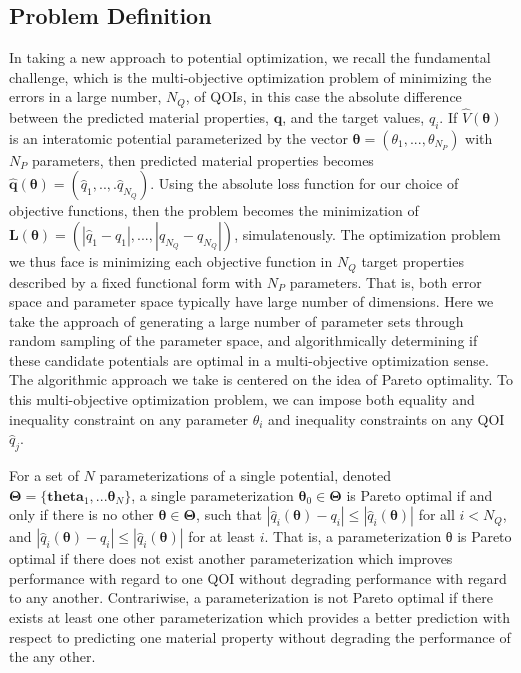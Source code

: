 \subsection{Problem Definition}

In taking a new approach to potential optimization, we recall the fundamental challenge, which is the multi-objective optimization problem of minimizing the errors in a large number, $N_Q$, of QOIs, in this case the absolute difference between the predicted material properties, $\bm{q}$, and the target values, $q_i$.  If  $\hat{V}(\bm{\theta})$ is an interatomic potential parameterized by the vector $\bm{\theta} = (\theta_1,...,\theta_{N_P})$ with $N_P$ parameters, then predicted material properties becomes $\hat{\bm{q}}(\bm{\theta}) = (\hat{q}_1,..,.\hat{q}_{N_Q})$.
Using the absolute loss function for our choice of objective functions, then the problem becomes the minimization of  $\bm{L}(\bm{\theta}) = (|\hat{q}_1-q_1|,...,|\hat{q}_{N_Q}-q_{N_Q}|)$, simulatenously.
The optimization problem we thus face is minimizing each objective function in $N_Q$ target properties described by a fixed functional form with $N_P$ parameters.  That is, both error space and parameter space typically have large number of dimensions.  Here we take the approach of generating a large number of parameter sets through random sampling of the parameter space, and algorithmically determining if these candidate potentials are optimal in a multi-objective optimization sense.  The algorithmic approach we take is centered on the idea of Pareto optimality.  To this multi-objective optimization problem, we can impose both equality and inequality constraint on any parameter $\theta_i$ and inequality constraints on any QOI $\hat{q}_j$.

For a set of $N$ parameterizations of a single potential, denoted $\bm{\Theta}= \{\bm{theta}_1,...\bm{\theta}_N\}$, a single parameterization $\bm{\theta}_0 \in \bm{\Theta}$ is Pareto optimal if and only if there is no other $\bm{\theta} \in \bm{\Theta}$, such that $|\hat{q}_i(\bm{\theta})-q_i| \leq |\hat{q}_i(\bm{\theta})|$
for all $i<N_Q$, and $|\hat{q}_i(\bm{\theta})-q_i| \leq |\hat{q}_i(\bm{\theta})|$ for at least $i$.  That is, a parameterization θ is Pareto optimal if there does not exist another parameterization which improves performance with regard to one QOI without degrading performance with regard to any another.  Contrariwise, a parameterization is not Pareto optimal if there exists at least one other parameterization which provides a better prediction with respect to predicting one material property without degrading the performance of the any other.

